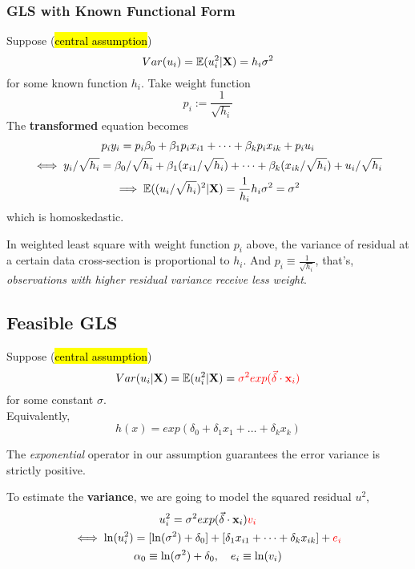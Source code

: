 \documentclass[]{article}
\begin{document}
			\subsubsection{GLS with Known Functional Form}
				Suppose (\hl{central assumption})
				\[
					Var(u_i) = \mathbb{E}({u_i^2|\textbf{X}}) = h_i \sigma^2
				\]
				for some known function $h_i$. Take weight function
				\[
					p_i := \frac{1}{\sqrt{h_i}}
				\]
				The \textbf{transformed} equation becomes
				\begin{gather*}
					p_i y_i = p_i \beta_0 + \beta_1 p_i x_{i1} + \dots + \beta_k p_i x _{ik} + p_i u_i \\
					\iff y_i / \sqrt{h_i} = \beta_0 / \sqrt{h_i} + \beta_1 (x_{i1}/\sqrt{h_i}) + \dots + \beta_k (x_{ik}/\sqrt{h_i}) + u_i / \sqrt{h_i} \\
					\implies \mathbb{E}({(u_i / \sqrt{h_i})^2 | \textbf{X}}) = \frac{1}{h_i} h_i \sigma^2 = \sigma^2
				\end{gather*}
				which is homoskedastic.
				\begin{remark}
					In weighted least square with weight function $p_i$ above, the variance of residual at a certain data cross-section is proportional to $h_i$. And $p_i \equiv \frac{1}{\sqrt{h_i}}$, that's, \emph{observations with higher residual variance receive less weight}.
				\end{remark}
			\subsection{Feasible GLS}
				Suppose (\hl{central assumption})
				\[
					Var(u_i|\textbf{X}) = \mathbb{E}({u_i^2|\textbf{X}}) = \textcolor{red}{\sigma^2 exp(\vec{\delta} \cdot \textbf{x}_i)}
				\]
				for some constant $\sigma$. \\
				Equivalently,
				\[
					h(x) = exp(\delta_0 + \delta_1 x_1 + \dots + \delta_k x_k)
				\]
				\begin{remark}
					The \emph{exponential} operator in our assumption guarantees the error variance is strictly positive.
				\end{remark}
				To estimate the \textbf{variance}, we are going to model the squared residual $u^2$,
				\begin{gather*}
					u_i^2 = \sigma^2 exp(\vec{\delta} \cdot \textbf{x}_i)\textcolor{red}{v_i} \\
					\iff \ln(u_i^2) = [\ln(\sigma^2) + \delta_0] + [\delta_1 x_{i1} + \dots + \delta_k x_{ik}] + \textcolor{red}{e_i} \\
					\alpha_0 \equiv \ln(\sigma^2) + \delta_0,\quad e_i \equiv \ln(v_i)
				\end{gather*}
\end{document}
